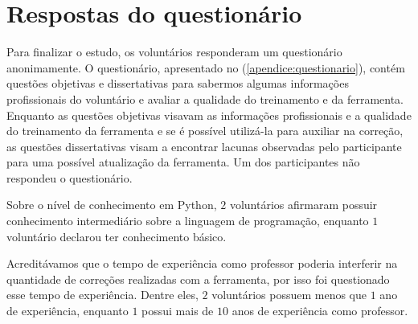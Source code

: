 %		
%		
		
	\section{Respostas do questionário}
		Para finalizar o estudo, os voluntários responderam um questionário
		anonimamente. O questionário, apresentado no (\cref{apendice:questionario}),
		contém questões objetivas e	dissertativas para sabermos algumas informações
		profissionais do voluntário e avaliar a qualidade do treinamento e da
		ferramenta. Enquanto as questões objetivas visavam as informações profissionais
		e a qualidade do treinamento da ferramenta e se é possível utilizá-la para
		auxiliar na correção, as questões dissertativas visam a encontrar lacunas
		observadas pelo participante para uma possível atualização da ferramenta.
		Um dos participantes não respondeu o questionário.
		
		Sobre o nível de conhecimento em Python, $2$ voluntários afirmaram possuir
		conhecimento intermediário sobre a linguagem de programação, enquanto $1$
		voluntário declarou ter conhecimento básico.		
		
		Acreditávamos que o tempo de experiência como professor poderia interferir
		na quantidade de correções realizadas com a ferramenta, por isso foi questionado
		esse tempo de experiência. Dentre eles, $2$ voluntários possuem menos que $1$
		ano de experiência, enquanto $1$ possui mais de $10$ anos de experiência como
		professor.
		
